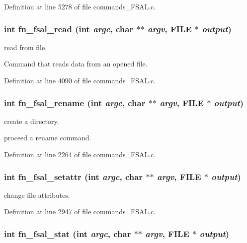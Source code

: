Definition at line 5278 of file commands\_\-FSAL.c.
\subsubsection[{fn\_\-fsal\_\-read}]{\setlength{\rightskip}{0pt plus 5cm}int fn\_\-fsal\_\-read (int {\em argc}, \/  char $\ast$$\ast$ {\em argv}, \/  FILE $\ast$ {\em output})}\label{commands_8h_35036b2c35ca5d8d4c69fe777b3bf61a}


read from file.

Command that reads data from an opened file. 

Definition at line 4090 of file commands\_\-FSAL.c.
\subsubsection[{fn\_\-fsal\_\-rename}]{\setlength{\rightskip}{0pt plus 5cm}int fn\_\-fsal\_\-rename (int {\em argc}, \/  char $\ast$$\ast$ {\em argv}, \/  FILE $\ast$ {\em output})}\label{commands_8h_f1fab75db40fed8f10b568eaa2e1ee83}


create a directory.

proceed a rename command. 

Definition at line 2264 of file commands\_\-FSAL.c.
\subsubsection[{fn\_\-fsal\_\-setattr}]{\setlength{\rightskip}{0pt plus 5cm}int fn\_\-fsal\_\-setattr (int {\em argc}, \/  char $\ast$$\ast$ {\em argv}, \/  FILE $\ast$ {\em output})}\label{commands_8h_64ebfd92fc63b2660ade0d2986941ad0}


change file attributes. 

Definition at line 2947 of file commands\_\-FSAL.c.
\subsubsection[{fn\_\-fsal\_\-stat}]{\setlength{\rightskip}{0pt plus 5cm}int fn\_\-fsal\_\-stat (int {\em argc}, \/  char $\ast$$\ast$ {\em argv}, \/  FILE $\ast$ {\em output})}\label{commands_8h_e507243945bd2b2378eaaa4b9ad07406}


